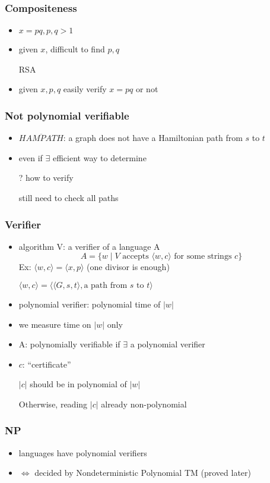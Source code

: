 \begin{frame}[allowframebreaks]
\begin{itemize}
\end{itemize}\end{frame} \begin{frame}[allowframebreaks] \frametitle{Compositeness}
  \begin{itemize}
\item $x=pq, p, q > 1$
\item given $x$, difficult to find $p,q$

RSA
\item given $x,p,q$ easily verify $x=pq $ or not
\end{itemize}\end{frame} \begin{frame}[allowframebreaks] \frametitle{Not polynomial verifiable}
  \begin{itemize}
\item $\overline{HAMPATH}$: a graph does not have a Hamiltonian
path from $s$ to $t$

\item even if $\exists$ efficient way to determine

? how to verify

still need to check all paths

\end{itemize}\end{frame} \begin{frame}[allowframebreaks] \frametitle{Verifier}
  \begin{itemize}
\item algorithm V: a verifier of a language A
  \begin{equation*}
    A=\{w\mid
V \mbox{ accepts } 
\langle  w,c\rangle  
\mbox{ for some strings } c\}
  \end{equation*}
Ex: $\langle  w,c\rangle  = \langle  x,p\rangle $ (one divisor is enough)

$\langle  w,c\rangle  = \langle  \langle  G,s,t\rangle , \mbox{a path from $s$ to $t$}\rangle $
\item polynomial verifier: polynomial time of $|w|$
\item we measure time on $|w|$ only

\item A: polynomially verifiable if 
$\exists$ a polynomial verifier
\item $c$: ``certificate''

$|c|$ should be in polynomial of $|w|$

Otherwise, reading $|c|$ already non-polynomial
\end{itemize}\end{frame} \begin{frame}[allowframebreaks] \frametitle{NP}
  \begin{itemize}
\item languages have polynomial verifiers
\item $\Leftrightarrow$ decided by 
Nondeterministic Polynomial TM (proved later)


\end{itemize}
\end{frame}
